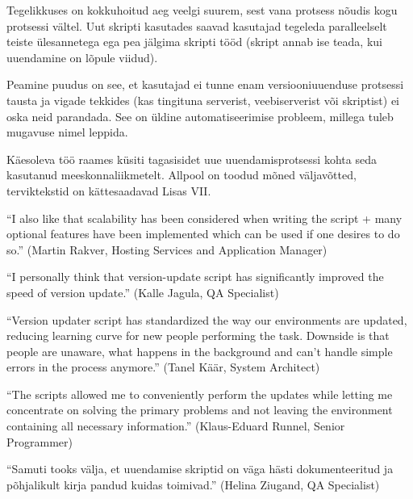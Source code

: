 \documentclass[12pt]{article}
\begin{document}
  Tegelikkuses on kokkuhoitud aeg veelgi suurem, sest vana protsess nõudis  kogu protsessi vältel. Uut skripti kasutades saavad kasutajad tegeleda paralleelselt teiste ülesannetega ega pea jälgima skripti tööd (skript annab ise teada, kui uuendamine on lõpule viidud).
  
  Peamine puudus on see, et kasutajad ei tunne enam versiooniuuenduse protsessi tausta ja vigade tekkides (kas tingituna serverist, veebiserverist või skriptist) ei oska neid parandada. See on üldine automatiseerimise probleem, millega tuleb mugavuse nimel leppida.
  
   Käesoleva töö raames küsiti tagasisidet uue uuendamisprotsessi kohta seda kasutanud meeskonnaliikmetelt. Allpool on toodud mõned väljavõtted, terviktekstid on kättesaadavad Lisas VII.
   
   \begin{displayquote}
   ``I also like that scalability has been considered when writing the script + many optional features have been implemented which can be used if one desires to do so.'' (Martin Rakver, Hosting Services and Application Manager)
   \end{displayquote}
   
   \begin{displayquote}
   ``I personally think that version-update script has significantly improved the speed of version update.'' (Kalle Jagula, QA Specialist)
   \end{displayquote}
   
   \begin{displayquote}
    ``Version updater script has standardized the way our environments are updated, reducing learning curve for new people performing the task. Downside is that people are unaware, what happens in the background and can't handle simple errors in the process anymore.'' (Tanel Käär, System Architect)
    \end{displayquote}
    
    \begin{displayquote}
    ``The scripts allowed me to conveniently perform the updates while letting me concentrate on solving the primary problems and not leaving the environment containing all necessary information.'' (Klaus-Eduard Runnel, Senior Programmer)
    \end{displayquote}
    
    \begin{displayquote}
    ``Samuti tooks välja, et uuendamise skriptid on väga hästi dokumenteeritud ja põhjalikult kirja pandud kuidas toimivad.'' (Helina Ziugand, QA Specialist)
    \end{displayquote}
\end{document}
